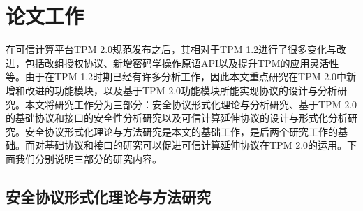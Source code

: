 

\section{论文工作} \label{sec:work}

在可信计算平台TPM 2.0规范发布之后，其相对于TPM 1.2进行了很多变化与改进，包括改组授权协议、新增密码学操作原语API以及提升TPM的应用灵活性等。由于在TPM 1.2时期已经有许多分析工作，因此本文重点研究在TPM 2.0中新增和改进的功能模块，以及基于TPM 2.0功能模块所能实现协议的设计与分析研究。本文将研究工作分为三部分：安全协议形式化理论与分析研究、基于TPM 2.0的基础协议和接口的安全性分析研究以及可信计算延伸协议的设计与形式化分析研究。安全协议形式化理论与方法研究是本文的基础工作，是后两个研究工作的基础。而对基础协议和接口的研究可以促进可信计算延伸协议在TPM 2.0的运用。下面我们分别说明三部分的研究内容。

\subsection{安全协议形式化理论与方法研究}

